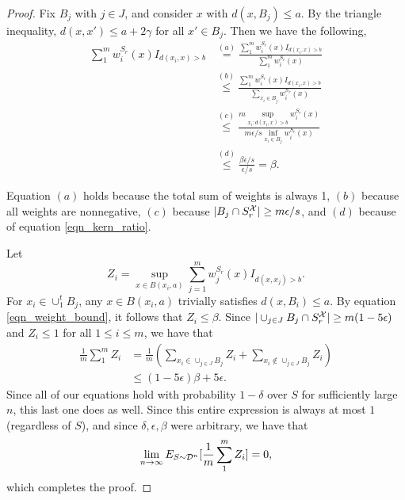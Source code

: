 \begin{proof}
Fix $B_j$ with $j \in J$, and consider $x$ with $d(x, B_j) \leq a$. By the triangle inequality, $d(x, x') \leq a+ 2\gamma$ for all $x' \in B_j$. Then we have the following,
\begin{equation}\label{eqn_weight_bound}
\begin{split}
\sum_1^m w_i^{S_r}(x)I_{d(x_i, x) > b} & \stackrel{(a)}{=} \frac{\sum_1^m w_i^{S_r}(x)I_{d(x_i, x) > b}}{\sum_1^m w_i^{S_r}(x)} \\
&\stackrel{(b)}{\leq} \frac{\sum_1^m w_i^{S_r}(x)I_{d(x_i, x) > b}}{\sum_{x_i \in B_j} w_i^{S_r}(x)} \\
&\stackrel{(c)}{\leq} \frac{m\sup_{x_i: d(x_i, x)>b}w_i^{S_r}(x)}{m\epsilon/s \inf_{x_i \in B_j} w_i^{S_r}(x)} \\
&\stackrel{(d)}{\leq} \frac{\beta\epsilon/s}{\epsilon/s} = \beta.
\end{split}
\end{equation}

Equation $(a)$ holds because the total sum of weights is always 1, $(b)$ because all weights are nonnegative, $(c)$ because $|B_j \cap S_r^\mathcal X| \geq m\epsilon/s$, and $(d)$ because of equation \ref{eqn_kern_ratio}.

Let $$Z_i=\sup_{x \in B(x_i, a)}\sum_{j=1}^m w_j^{S_r}(x)I_{d(x, x_j) > b}.$$ For $x_i \in \cup_1^t B_j$, any $x \in B(x_i,a)$ trivially satisfies $d(x, B_i) \leq a$. By equation \ref{eqn_weight_bound}, it follows that $Z_i \leq \beta.$ Since $|\cup_{j \in J} B_j \cap S_r^\mathcal X| \geq m(1-5\epsilon)$ and $Z_i \leq 1$ for all $1 \leq i \leq m$, we have that 
\begin{equation*}
\begin{split}
\frac{1}{m}\sum_1^m Z_i &= \frac{1}{m}(\sum_{x_i \in \cup_{j \in J} B_j} Z_i+ \sum_{x_i \notin \cup_{j \in J} B_j} Z_i)\\
&\leq (1-5\epsilon)\beta + 5\epsilon.
\end{split}
\end{equation*}
Since all of our equations hold with probability $1-\delta$ over $S$ for sufficiently large $n$, this last one does as well. Since this entire expression is always at most $1$ (regardless of $S$), and  since $\delta, \epsilon, \beta$ were arbitrary, we have that $$\lim_{n \to \infty} E_{S \sim {\mathcal D}^n}[\frac{1}{m}\sum_1^m Z_i] = 0,$$ which completes the proof. 

\end{proof}

